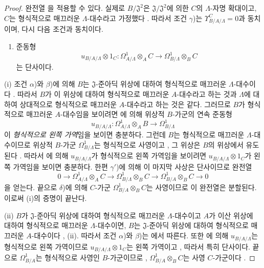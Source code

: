 \begin{proof}
완전열 을 적용할 수 있다. 실제로
$B/\mathfrak J^2$은 $\mathfrak J/\mathfrak J^2$에 의한 $C$의
$\Lambda$-자명 확대이고, $C$는 형식적으로 매끄러운 $\Lambda$-대수라고
가정했다 . 따라서 조건 $\gamma$)는
$\Upsilon^C_{B/A/\Lambda}=0$과 동치이며, 다시 다음 조건과 동치이다.
\begin{enumerate}
  \item[$\gamma'$)] 준동형
  \[
    u_{B/A/\Lambda}\otimes 1_C:
    \Omega^1_{A/\Lambda}\otimes_A C
    \longrightarrow \Omega^1_{B/\Lambda}\otimes_B C
  \]
  는 단사이다.
\end{enumerate}

(i) 조건 $\alpha$)와 $\beta$)에 의해 $B$는 $\mathfrak J$-준아딕
위상에 대하여 형식적으로 매끄러운 $\Lambda$-대수이다
. 따라서 $B$가 이 위상에 대하여 형식적으로
매끄러운 $A$-대수라고 하는 것과 $\Lambda$에 대하여 상대적으로
형식적으로 매끄러운 $A$-대수라고 하는 것은 같다. 그러므로 $B$가
형식적으로 매끄러운 $A$-대수임을 보이려면 에 의해
위상적 $B$-가군의 연속 준동형
\[
  u_{B/A/\Lambda}:\Omega^1_{A/\Lambda}\otimes_A B
  \longrightarrow\Omega^1_{B/\Lambda}
\]
이 \emph{형식적으로 왼쪽 가역}임을 보이면 충분하다. 그런데 $B$는
형식적으로 매끄러운 $\Lambda$-대수이므로 위상적 $B$-가군
$\Omega^1_{B/\Lambda}$는 형식적으로 사영이고
, 그 위상은 $B$의 위상에서 유도된다
. 따라서 에 의해
$u_{B/A/\Lambda}$가 형식적으로 왼쪽 가역임을 보이려면
$u_{B/A/\Lambda}\otimes1_C$가 왼쪽 가역임을 보이면 충분하다. 한편
$\gamma'$)에 의해 이 마지막 사상은 단사이므로 완전열
\[
  0\longrightarrow\Omega^1_{A/\Lambda}\otimes_A C
  \longrightarrow\Omega^1_{B/\Lambda}\otimes_B C
  \longrightarrow\Omega^1_{B/A}\otimes_B C\longrightarrow0
\]
을 얻는다. 끝으로 $\delta$)에 의해 $C$-가군
$\Omega^1_{B/A}\otimes_BC$는 사영이므로 이 완전열은 분할된다. 이로써
(i)의 증명이 끝난다.


(ii) $B$가 $\mathfrak J$-준아딕 위상에 대하여 형식적으로 매끄러운
$\Lambda$-대수이고 $A$가 이산 위상에 대하여 형식적으로 매끄러운
$\Lambda$-대수이면, $B$는 $\mathfrak J$-준아딕 위상에 대하여
형식적으로 매끄러운 $A$-대수이다 , (ii). 따라서
조건 $\alpha$)와 $\beta$)는 에서 따른다. 또한
에 의해 $u_{B/A/\Lambda}$는 형식적으로 왼쪽
가역이므로 $u_{B/A/\Lambda}\otimes1_C$는 왼쪽 가역이고
, 따라서 특히 단사이다. 끝으로
$\Omega^1_{B/A}$는 형식적으로 사영인 $B$-가군이므로
, $\Omega^1_{B/A}\otimes_BC$는 사영 $C$-가군이다
.
\end{proof}

